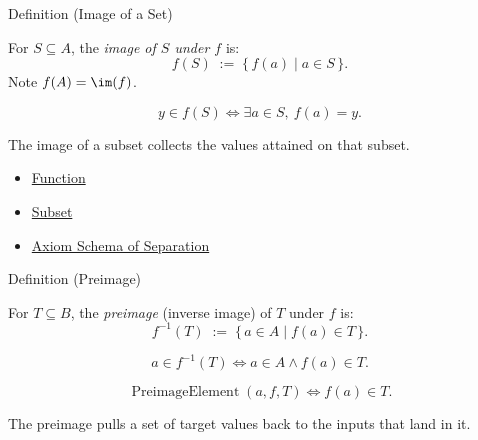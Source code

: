 \begin{definitionbox}{Definition (Image of a Set)}
\begin{definition}\label{def:image-set}
For $S \subseteq A$, the \emph{image of $S$ under $f$} is:
\[
f(S) \;:=\; \{\, f(a) \mid a \in S \,\}.
\]
Note $f(A) = \im(f)$.
\end{definition}
\end{definitionbox}

\begin{remark*}
\[
  y\in f(S)
  \iff
  \exists a\in S,\ f(a)=y.
\]
\end{remark*}

\begin{remark*}[Interpretation]
The image of a subset collects the values attained on that subset.
\end{remark*}

\begin{dependencies}
\begin{itemize}
  \item \hyperref[def:function]{Function}
  \item \hyperref[def:subset]{Subset}
  \item \hyperref[ax:separation]{Axiom Schema of Separation}
\end{itemize}
\end{dependencies}

\begin{definitionbox}{Definition (Preimage)}
\begin{definition}[Preimage]\label{def:preimage}
For $T \subseteq B$, the \emph{preimage} (inverse image) of $T$ under $f$ is:
\[
f^{-1}(T) \;:=\; \{\, a \in A \mid f(a) \in T \,\}.
\]
\end{definition}
\end{definitionbox}

\begin{remark*}
\[
  a\in f^{-1}(T)
  \iff
  a\in A\wedge f(a)\in T.
\]
\end{remark*}

\begin{remark*}
\[
  \operatorname{PreimageElement}(a,f,T)
  \iff
  f(a)\in T.
\]
\end{remark*}

\begin{remark*}[Interpretation]
The preimage pulls a set of target values back to the inputs that land in it.
\end{remark*}

